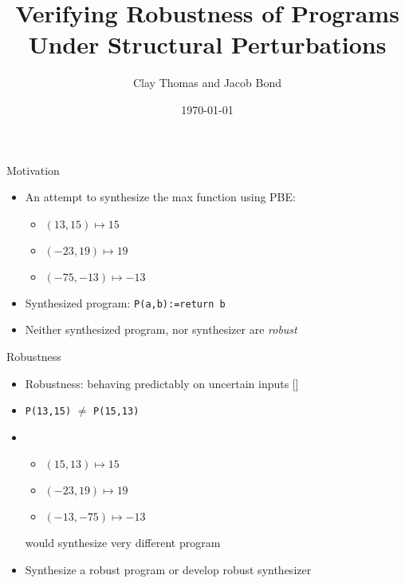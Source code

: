 \documentclass[usenames,dvipsnames]{beamer}
\title{Verifying Robustness of Programs Under Structural Perturbations}
\author{Clay Thomas and Jacob Bond}
\date{\today}
\begin{document}

\begin{frame}
  \titlepage
\end{frame}

\begin{frame}[fragile]{Motivation}
    \begin{itemize}
        \item<1-> An attempt to synthesize the max function using PBE:
            \begin{itemize}
                \item \((13, 15) \mapsto 15\)
                \item \((-23, 19) \mapsto 19\)
                \item \((-75, -13) \mapsto -13\)
            \end{itemize}
        \item<2-> Synthesized program: \verb!P(a,b):=return b!
        \item<3-> Neither synthesized program, nor synthesizer are {\it robust}
    \end{itemize}
\end{frame}

\begin{frame}[fragile]{Robustness}
    \begin{itemize}
        \item<1-> Robustness: behaving predictably on uncertain inputs [\cite{chaudhuri12}]
        \item<2-> \verb!P(13,15)! \(\not=\) \verb!P(15,13)!
        \item<3-> 
            \begin{itemize}
                \item \((15, 13) \mapsto 15\)
                \item \((-23, 19) \mapsto 19\)
                \item \((-13, -75) \mapsto -13\)
            \end{itemize}
            would synthesize very different program
        \item<4-> Synthesize a robust program or develop robust synthesizer
    \end{itemize}
\end{frame}
\end{document}
